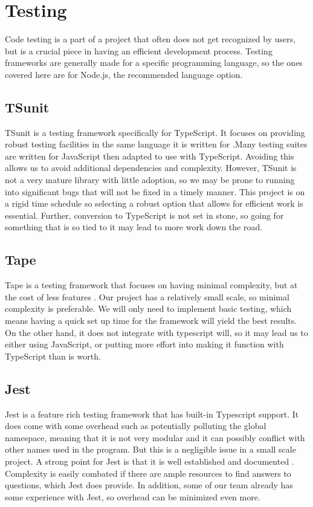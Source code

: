 \documentclass[draftclsnofoot,onecolumn,10pt]{IEEEtran}
\begin{document}
    \break
	\section{Testing}
        Code testing is a part of a project that often does not get recognized by users, but is a crucial piece in having an efficient development process. Testing frameworks are generally made for a specific programming language, so the ones covered here are for Node.js, the recommended language option.
        \subsection{TSunit}
            TSunit is a testing framework specifically for TypeScript. It focuses on providing robust testing facilities in the same language it is written for \cite{tsunit}.Many testing suites are written for JavaScript then adapted to use with TypeScript. Avoiding this allows us to avoid additional dependencies and complexity. However, TSunit is not a very mature library with little adoption, so we may be prone to running into significant bugs that will not be fixed in a timely manner. This project is on a rigid time schedule so selecting a robust option that allows for efficient work is essential. Further, conversion to TypeScript is not set in stone, so going for something that is so tied to it may lead to more work down the road.
        \subsection{Tape}
            Tape is a testing framework that focuses on having minimal complexity, but at the cost of less features \cite{tape}. Our project has a relatively small scale, so minimal complexity is preferable. We will only need to implement basic testing, which means having a quick set up time for the framework will yield the best results. On the other hand, it does not integrate with typescript will, so it may lead us to either using JavaScript, or putting more effort into making it function with TypeScript than is worth.
        \subsection{Jest}
            Jest is a feature rich testing framework that has built-in Typescript support. It does come with some overhead such as potentially polluting the global namespace, meaning that it is not very modular and it can possibly conflict with other names used in the program. But this is a negligible issue in a small scale project. A strong point for Jest is that it is well established and documented \cite{jest}. Complexity is easily combated if there are ample resources to find answers to questions, which Jest does provide. In addition, some of our team already has some experience with Jest, so overhead can be minimized even more.
\\\\
\end{document}
